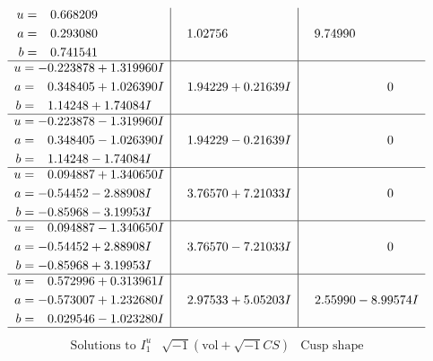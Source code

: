 \documentclass[1p]{elsarticle_modified}
\theoremstyle{definition}
\newcommand{\I}{\sqrt{-1}}
\begin{document}
$$\begin{array}{c|c|c}
\begin{aligned}
u &= \phantom{-}0.668209\phantom{ +0.000000I} \\
a &= \phantom{-}0.293080\phantom{ +0.000000I} \\
b &= \phantom{-}0.741541\phantom{ +0.000000I}\end{aligned}
 & \phantom{-}1.02756\phantom{ +0.000000I} & \phantom{-}9.74990\phantom{ +0.000000I} \\ \hline\begin{aligned}
u &= -0.223878 + 1.319960 I \\
a &= \phantom{-}0.348405 + 1.026390 I \\
b &= \phantom{-}1.14248 + 1.74084 I\end{aligned}
 & \phantom{-}1.94229 + 0.21639 I & \phantom{-0.000000 } 0 \\ \hline\begin{aligned}
u &= -0.223878 - 1.319960 I \\
a &= \phantom{-}0.348405 - 1.026390 I \\
b &= \phantom{-}1.14248 - 1.74084 I\end{aligned}
 & \phantom{-}1.94229 - 0.21639 I & \phantom{-0.000000 } 0 \\ \hline\begin{aligned}
u &= \phantom{-}0.094887 + 1.340650 I \\
a &= -0.54452 - 2.88908 I \\
b &= -0.85968 - 3.19953 I\end{aligned}
 & \phantom{-}3.76570 + 7.21033 I & \phantom{-0.000000 } 0 \\ \hline\begin{aligned}
u &= \phantom{-}0.094887 - 1.340650 I \\
a &= -0.54452 + 2.88908 I \\
b &= -0.85968 + 3.19953 I\end{aligned}
 & \phantom{-}3.76570 - 7.21033 I & \phantom{-0.000000 } 0 \\ \hline\begin{aligned}
u &= \phantom{-}0.572996 + 0.313961 I \\
a &= -0.573007 + 1.232680 I \\
b &= \phantom{-}0.029546 - 1.023280 I\end{aligned}
 & \phantom{-}2.97533 + 5.05203 I & \phantom{-}2.55990 - 8.99574 I\\
 \hline 
 \end{array}$$\newpage$$\begin{array}{c|c|c}  
\text{Solutions to }I^u_{1}& \I (\text{vol} + \sqrt{-1}CS) & \text{Cusp shape}\\

\end{array}$$
\end{document}
